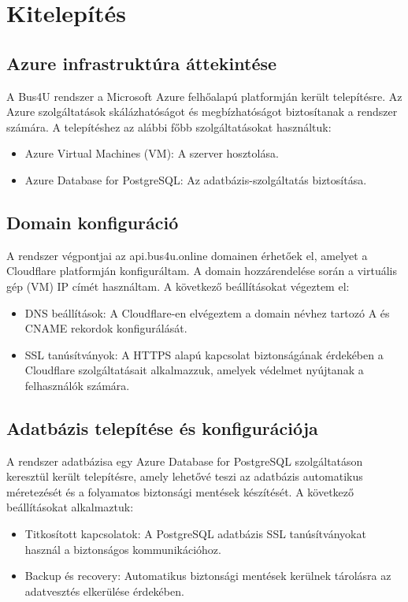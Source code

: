 \section{Kitelepítés}

\subsection{Azure infrastruktúra áttekintése}
A Bus4U rendszer a Microsoft Azure felhőalapú platformján került telepítésre. Az Azure szolgáltatások skálázhatóságot és megbízhatóságot biztosítanak a rendszer számára. A telepítéshez az alábbi főbb szolgáltatásokat használtuk:
\begin{itemize}
    \item Azure Virtual Machines (VM): A szerver hosztolása.
    \item Azure Database for PostgreSQL: Az adatbázis-szolgáltatás biztosítása.
\end{itemize}

\subsection{Domain konfiguráció}
A rendszer végpontjai az api.bus4u.online domainen érhetőek el, amelyet a Cloudflare platformján konfiguráltam. A domain hozzárendelése során a virtuális gép (VM) IP címét használtam. A következő beállításokat végeztem el:
\begin{itemize}
    \item DNS beállítások: A Cloudflare-en elvégeztem a domain névhez tartozó A és CNAME rekordok konfigurálását.
    \item SSL tanúsítványok: A HTTPS alapú kapcsolat biztonságának érdekében a Cloudflare szolgáltatásait alkalmazzuk, amelyek védelmet nyújtanak a felhasználók számára.
\end{itemize}


\subsection{Adatbázis telepítése és konfigurációja}
A rendszer adatbázisa egy Azure Database for PostgreSQL szolgáltatáson keresztül került telepítésre, amely lehetővé teszi az adatbázis automatikus méretezését és a folyamatos biztonsági mentések készítését. A következő beállításokat alkalmaztuk:
\begin{itemize}
    \item Titkosított kapcsolatok: A PostgreSQL adatbázis SSL tanúsítványokat használ a biztonságos kommunikációhoz.
    \item Backup és recovery: Automatikus biztonsági mentések kerülnek tárolásra az adatvesztés elkerülése érdekében.
\end{itemize}


